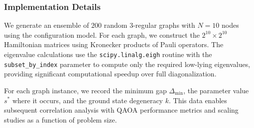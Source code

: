 \subsubsection{Implementation Details}

We generate an ensemble of $200$ random 3-regular graphs with $N=10$ nodes using the configuration model. For each graph, we construct the $2^{10} \times 2^{10}$ Hamiltonian matrices using Kronecker products of Pauli operators. The eigenvalue calculations use the \texttt{scipy.linalg.eigh} routine with the \texttt{subset\_by\_index} parameter to compute only the required low-lying eigenvalues, providing significant computational speedup over full diagonalization.

For each graph instance, we record the minimum gap $\Delta_{\text{min}}$, the parameter value $s^*$ where it occurs, and the ground state degeneracy $k$. This data enables subsequent correlation analysis with QAOA performance metrics and scaling studies as a function of problem size.
